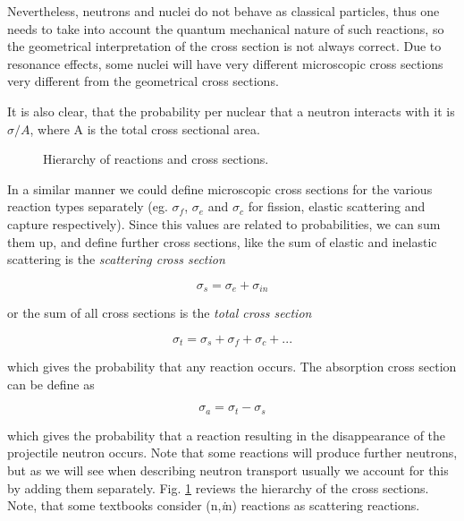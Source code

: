Nevertheless, neutrons and nuclei do not behave as classical particles, thus one needs to take into account the quantum mechanical nature of such reactions, so the geometrical interpretation of the cross section is not always correct. Due to resonance effects, some nuclei will have very different microscopic cross sections very different from the geometrical cross sections. 

It is also clear, that the probability per nuclear that a neutron interacts with it is $\sigma/A$, where A is the total cross sectional area.

\begin{figure}[ht!]
\protect {}\protect
\caption{\label{fig:xshierarchy} \footnotesize{Hierarchy of reactions and cross sections.}}
\end{figure}

In a similar manner we could define microscopic cross sections for the various reaction types separately (eg. $\sigma_f$, $\sigma_e$ and $\sigma_c$ for fission, elastic scattering and capture respectively). Since this values are related to probabilities, we can sum them up, and define further cross sections, like the sum of elastic and inelastic scattering is the \textit{scattering cross section}

\[
\sigma_s=\sigma_e + \sigma_{in}
\]

or the sum of all cross sections is the \textit{total cross section}

\[
\sigma_t=\sigma_s + \sigma_{f}+ \sigma_{c} + ...
\]

which gives the probability that any reaction occurs. The absorption cross section can be define as 


\[
\sigma_a=\sigma_t - \sigma_s
\]

which gives the probability that a reaction resulting in the disappearance of the projectile neutron occurs. Note that some reactions will produce further neutrons, but as we will see when describing neutron transport usually we account for this by adding them separately. Fig. \ref{fig:xshierarchy} reviews the hierarchy of the cross sections. Note, that some textbooks consider (n,\textit{i}n) reactions as scattering reactions.

